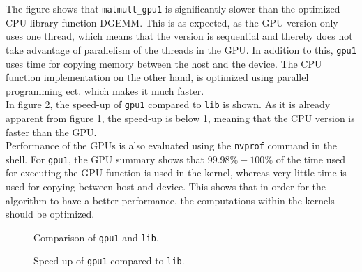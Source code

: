 \noindent The figure shows that \texttt{matmult\_gpu1} is significantly slower than the optimized CPU library function DGEMM. This is as expected, as the GPU version only uses one thread, which means that the version is sequential and thereby does not take advantage of parallelism of the threads in the GPU. In addition to this, \texttt{gpu1} uses time for copying memory between the host and the device. The CPU function implementation on the other hand, is optimized using parallel programming ect. which makes it much faster. \\

\noindent In figure \ref{fig:speed_gpu1}, the speed-up of \texttt{gpu1} compared to \texttt{lib} is shown. As it is already apparent from figure \ref{fig:compare_gpu1}, the speed-up is below 1, meaning that the CPU version is faster than the GPU. \\

\noindent Performance of the GPUs is also evaluated using the \texttt{nvprof} command in the shell. For \texttt{gpu1}, the GPU summary shows that $99.98\%-100\%$ of the time used for executing the GPU function is used in the kernel, whereas very little time is used for copying between host and device. This shows that in order for the algorithm to have a better performance, the computations within the kernels should be optimized. \\


\begin{figure}[H]
\centering
{}
\caption{Comparison of \texttt{gpu1} and \texttt{lib}.}
\label{fig:compare_gpu1}
\end{figure}

\begin{figure}[H]
\centering
{}
\caption{Speed up of \texttt{gpu1} compared to \texttt{lib}.}
\label{fig:speed_gpu1}
\end{figure}


